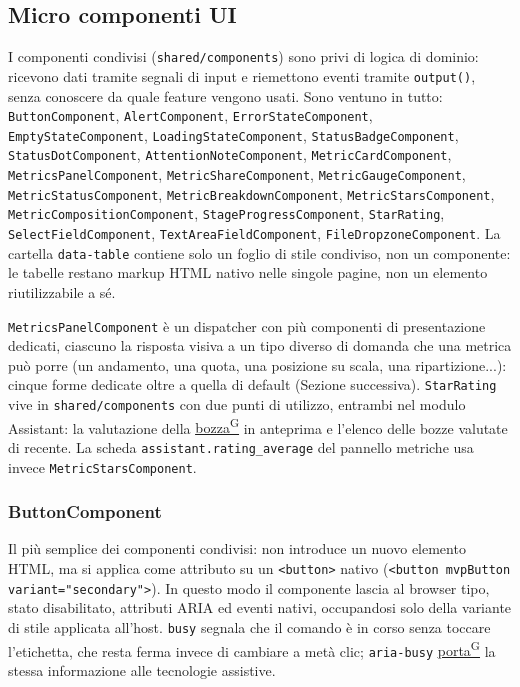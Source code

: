 \documentclass[a4paper,12pt]{article}
\providecommand{\glslink}[2]{\href{https://alittlebyte-19.github.io/Documentazione/glossario.html\#gls-#1}{\underline{#2}\textsuperscript{\scriptsize G}}}
\begin{document}
\begin{sloppypar}
\subsection{Micro componenti UI}

I componenti condivisi (\texttt{shared/components}) sono privi di logica di dominio: ricevono dati tramite segnali di input e riemettono eventi tramite \texttt{output()}, senza conoscere da quale feature vengono usati. Sono ventuno in tutto: \texttt{ButtonComponent}, \texttt{AlertComponent}, \texttt{ErrorStateComponent}, \texttt{EmptyStateComponent}, \texttt{LoadingStateComponent}, \texttt{StatusBadgeComponent}, \texttt{StatusDotComponent}, \texttt{AttentionNoteComponent}, \texttt{MetricCardComponent}, \texttt{MetricsPanelComponent}, \texttt{MetricShareComponent}, \texttt{MetricGaugeComponent}, \texttt{MetricStatusComponent}, \texttt{MetricBreakdownComponent}, \texttt{MetricStarsComponent}, \texttt{MetricCompositionComponent}, \texttt{StageProgressComponent}, \texttt{StarRating}, \texttt{SelectFieldComponent}, \texttt{TextAreaFieldComponent}, \texttt{FileDropzoneComponent}. La cartella \texttt{data-table} contiene solo un foglio di stile condiviso, non un componente: le tabelle restano markup HTML nativo nelle singole pagine, non un elemento riutilizzabile a sé.

\texttt{MetricsPanelComponent} è un dispatcher con più componenti di presentazione dedicati, ciascuno la risposta visiva a un tipo diverso di domanda che una metrica può porre (un andamento, una quota, una posizione su scala, una ripartizione...): cinque forme dedicate oltre a quella di default (Sezione successiva). \texttt{StarRating} vive in \texttt{shared/components} con due punti di utilizzo, entrambi nel modulo Assistant: la valutazione della \glslink{bozza-draft}{bozza} in anteprima e l'elenco delle bozze valutate di recente. La scheda \texttt{assistant.rating\_average} del pannello metriche usa invece \texttt{MetricStarsComponent}.

\subsubsection{ButtonComponent}

Il più semplice dei componenti condivisi: non introduce un nuovo elemento HTML, ma si applica come attributo su un \texttt{<button>} nativo (\texttt{<button mvpButton variant="secondary">}). In questo modo il componente lascia al browser tipo, stato disabilitato, attributi ARIA ed eventi nativi, occupandosi solo della variante di stile applicata all'host. \texttt{busy} segnala che il comando è in corso senza toccare l'etichetta, che resta ferma invece di cambiare a metà clic; \texttt{aria-busy} \glslink{porta}{porta} la stessa informazione alle tecnologie assistive.


\end{sloppypar}
\end{document}
